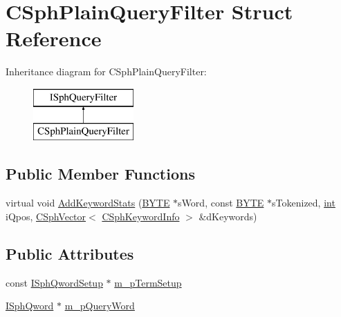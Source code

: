 \hypertarget{structCSphPlainQueryFilter}{\section{C\-Sph\-Plain\-Query\-Filter Struct Reference}
\label{structCSphPlainQueryFilter}
}
Inheritance diagram for C\-Sph\-Plain\-Query\-Filter\-:\begin{figure}[H]
\begin{center}
\leavevmode
\includegraphics[height=2.000000cm]{structCSphPlainQueryFilter}
\end{center}
\end{figure}
\subsection*{Public Member Functions}
\begin{DoxyCompactItemize}
\item 
virtual void \hyperlink{structCSphPlainQueryFilter_ac313f2ea56a84ed9f0e82c1654b79e5d}{Add\-Keyword\-Stats} (\hyperlink{sphinxstd_8h_a4ae1dab0fb4b072a66584546209e7d58}{B\-Y\-T\-E} $\ast$s\-Word, const \hyperlink{sphinxstd_8h_a4ae1dab0fb4b072a66584546209e7d58}{B\-Y\-T\-E} $\ast$s\-Tokenized, \hyperlink{sphinxexpr_8cpp_a4a26e8f9cb8b736e0c4cbf4d16de985e}{int} i\-Qpos, \hyperlink{classCSphVector}{C\-Sph\-Vector}$<$ \hyperlink{structCSphKeywordInfo}{C\-Sph\-Keyword\-Info} $>$ \&d\-Keywords)
\end{DoxyCompactItemize}
\subsection*{Public Attributes}
\begin{DoxyCompactItemize}
\item 
const \hyperlink{classISphQwordSetup}{I\-Sph\-Qword\-Setup} $\ast$ \hyperlink{structCSphPlainQueryFilter_a430b515a882386b3f0573b15235cc932}{m\-\_\-p\-Term\-Setup}
\item 
\hyperlink{classISphQword}{I\-Sph\-Qword} $\ast$ \hyperlink{structCSphPlainQueryFilter_ab300154394293ddfef3caa172023dcdf}{m\-\_\-p\-Query\-Word}
\end{DoxyCompactItemize}


